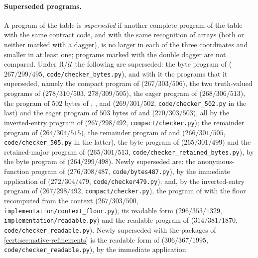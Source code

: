 \paragraph{Superseded programs.} A program of the table is \emph{superseded}
if another complete program of the table with the same contract code, and
with the same recognition of arrays (both or neither marked with a dagger), is
no larger in each of the three coordinates and smaller in at least one;
programs marked with the double dagger are not compared. Under
R/$\mathcal U$ the following are superseded: the byte program of
 ($267/299/495$, \texttt{code/checker\_bytes.py}), and with
it the programs that it superseded, namely the compact program of
 ($267/303/506$), the two truth-valued
programs of  ($278/310/503$, $278/309/505$), the eager
program of  ($268/306/513$), the program of $502$ bytes
of , ,
 and  ($269/301/502$,
\texttt{code/checker\_502.py} in the last) and the eager program of $503$
bytes of  and 
($270/303/503$), all by the inverted-entry program of
 ($267/298/492$, \texttt{compact/checker.py});
the remainder program of  ($264/304/515$), the
remainder program of  and 
($266/301/505$, \texttt{code/checker\_505.py} in the latter), the byte
program of  ($265/301/499$) and the retained-major
program of  ($265/301/513$,
\texttt{code/checker\_retained\_bytes.py}), by the byte program of
 ($264/299/498$). Newly superseded are: the
anonymous-function program of  ($276/308/487$,
\texttt{code/bytes487.py}), by the immediate application of
 ($272/304/479$, \texttt{code/checker479.py});
and, by the inverted-entry program of 
($267/298/492$, \texttt{compact/checker.py}), the program of
 with the floor recomputed from the context
($267/303/500$, \texttt{implementation/context\_floor.py}), its readable form
($296/353/1329$, \texttt{implementation/readable.py}) and the readable program
of  ($314/381/1870$, \texttt{code/checker\_readable.py}).
Newly superseded with the packages of \cref{cert:sec:native-refinements} is
the readable form of  ($306/367/1995$,
\texttt{code/checker\_readable.py}), by the immediate application
